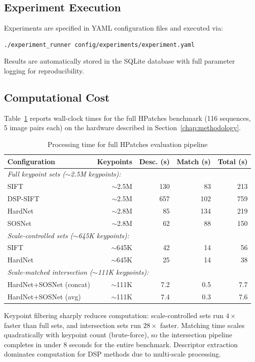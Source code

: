 \subsection{Experiment Execution}

Experiments are specified in YAML configuration files and executed via:

\begin{verbatim}
./experiment_runner config/experiments/experiment.yaml
\end{verbatim}

Results are automatically stored in the SQLite database with full parameter logging for reproducibility.

\subsection{Computational Cost}

Table~\ref{tab:timing} reports wall-clock times for the full HPatches benchmark (116 sequences, 5 image pairs each) on the hardware described in Section~\ref{chap:methodology}.

\begin{table}[ht]
\centering
\caption{Processing time for full HPatches evaluation pipeline}
\label{tab:timing}
\begin{tabular}{lrrrr}
\toprule
\textbf{Configuration} & \textbf{Keypoints} & \textbf{Desc. (s)} & \textbf{Match (s)} & \textbf{Total (s)} \\
\midrule
\multicolumn{5}{l}{\textit{Full keypoint sets ($\sim$2.5M keypoints):}} \\
SIFT & $\sim$2.5M & 130 & 83 & 213 \\
DSP-SIFT & $\sim$2.5M & 657 & 102 & 759 \\
HardNet & $\sim$2.8M & 85 & 134 & 219 \\
SOSNet & $\sim$2.8M & 62 & 88 & 150 \\
\midrule
\multicolumn{5}{l}{\textit{Scale-controlled sets ($\sim$645K keypoints):}} \\
SIFT & $\sim$645K & 42 & 14 & 56 \\
HardNet & $\sim$645K & 25 & 14 & 38 \\
\midrule
\multicolumn{5}{l}{\textit{Scale-matched intersection ($\sim$111K keypoints):}} \\
HardNet+SOSNet (concat) & $\sim$111K & 7.2 & 0.5 & 7.7 \\
HardNet+SOSNet (avg) & $\sim$111K & 7.4 & 0.3 & 7.6 \\
\bottomrule
\end{tabular}
\end{table}

Keypoint filtering sharply reduces computation: scale-controlled sets run $4\times$ faster than full sets, and intersection sets run $28\times$ faster. Matching time scales quadratically with keypoint count (brute-force), so the intersection pipeline completes in under 8 seconds for the entire benchmark. Descriptor extraction dominates computation for DSP methods due to multi-scale processing.
